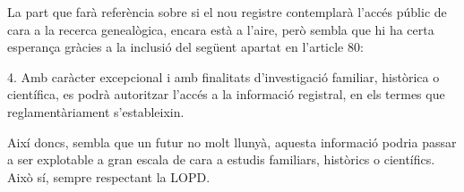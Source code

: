     La part que farà referència sobre si el nou registre contemplarà l'accés públic de cara a la recerca genealògica, encara està a l'aire, però sembla que hi ha certa esperança gràcies a la inclusió del següent apartat en l'article 80:

    \begin{displayquote}
        4. Amb caràcter excepcional i amb finalitats d'investigació familiar, històrica o científica, es podrà autoritzar l'accés a la informació registral, en els termes que reglamentàriament s'estableixin.
    \end{displayquote}

    Així doncs, sembla que un futur no molt llunyà, aquesta informació podria passar a ser explotable a gran escala de cara a estudis familiars, històrics o científics. Això sí, sempre respectant la \gls{LOPD}.
